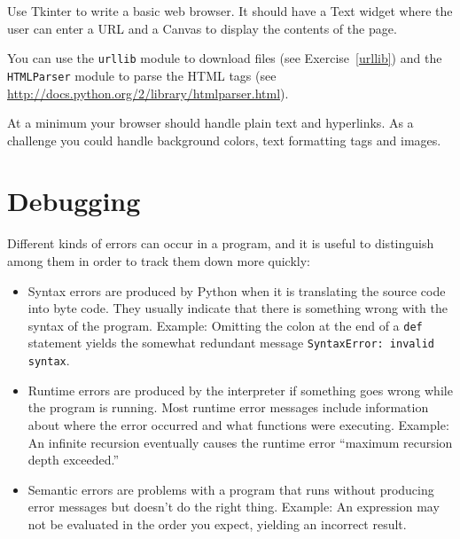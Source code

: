 \documentclass[10pt]{book}
\begin{document}
\begin{exercise}

Use Tkinter to write a basic web browser.  It
should have a Text widget where the user can enter a URL
and a Canvas to display the contents of the page.

You can use the {\tt urllib} module to download files
(see Exercise~\ref{urllib}) and
the {\tt HTMLParser} module to parse the HTML
tags (see \url{http://docs.python.org/2/library/htmlparser.html}).

At a minimum your browser should handle plain text and hyperlinks.  As
a challenge you could handle background colors, text
formatting tags and images.


\end{exercise}



\appendix

\chapter{Debugging}

Different kinds of errors can occur
in a program, and it is useful to distinguish among them
in order to track them down more quickly:

\begin{itemize}

\item Syntax errors are produced by Python when it is translating the
  source code into byte code.  They usually indicate that there is
  something wrong with the syntax of the program.  Example: Omitting
  the colon at the end of a {\tt def} statement yields the somewhat
  redundant message {\tt SyntaxError: invalid syntax}.

\item Runtime errors are produced by the interpreter if something goes
  wrong while the program is running.  Most runtime error messages
  include information about where the error occurred and what
  functions were executing.  Example: An infinite recursion eventually
  causes the runtime error ``maximum recursion depth exceeded.''

\item Semantic errors are problems with a program that runs without
  producing error messages but doesn't do the right thing.  Example:
  An expression may not be evaluated in the order you expect, yielding
  an incorrect result.

\end{itemize}
\end{document}
